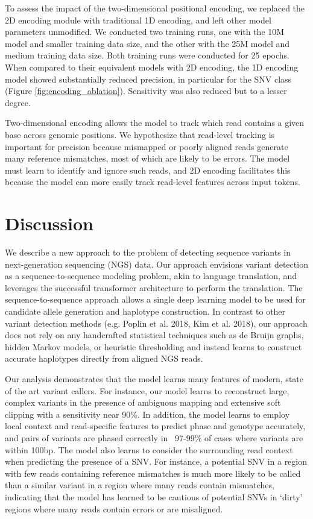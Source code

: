 \documentclass[]{article}
\begin{document}
To assess the impact of the two-dimensional positional encoding, we replaced the 2D encoding module with traditional 1D encoding, and left other model parameters unmodified. We conducted two training runs, one with the 10M model and smaller training data size, and the other with the 25M model and medium training data size. Both training runs were conducted for 25 epochs. When compared to their equivalent models with 2D encoding, the 1D encoding model showed substantially reduced precision, in particular for the SNV class (Figure \ref{fig:encoding_ablation}). Sensitivity was also reduced but to a lesser degree. 

Two-dimensional encoding allows the model to track which read contains a given base across genomic positions. We hypothesize that read-level tracking is important for precision because mismapped or poorly aligned reads generate many reference mismatches, most of which are likely to be errors. The model must learn to identify and ignore such reads, and 2D encoding facilitates this because the model can more easily track read-level features across input tokens. 
 

\section{Discussion}

We describe a new approach to the problem of detecting sequence variants in next-generation sequencing (NGS) data. Our approach envisions variant detection as a sequence-to-sequence modeling problem, akin to language translation, and leverages the successful transformer architecture to perform the translation. The sequence-to-sequence approach allows a single deep learning model to be used for candidate allele generation and haplotype construction.  In contrast to other variant detection methods (e.g. Poplin et al. 2018,  Kim et al. 2018), our approach does not rely on any handcrafted statistical techniques such as de Bruijn graphs, hidden Markov models, or heuristic thresholding and instead learns to construct accurate haplotypes directly from aligned NGS reads. 
 
Our analysis demonstrates that the model learns many features of modern, state of the art variant callers. For instance, our model learns to reconstruct large, complex variants in the presence of ambiguous mapping and extensive soft clipping with a sensitivity near 90\%. In addition, the model learns to employ local context and read-specific features to predict phase and genotype accurately, and pairs of variants are phased correctly in ~97-99\% of cases where variants are within 100bp.  The model also learns to consider the surrounding read context when predicting the presence of a SNV. For instance, a potential SNV in a region with few reads containing reference mismatches is much more likely to be called than a similar variant in a region where many reads contain mismatches, indicating that the model has learned to be cautious of potential SNVs in `dirty' regions where many reads contain errors or are misaligned. 
\end{document}
